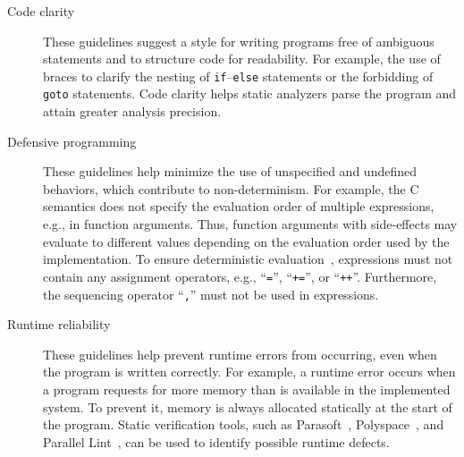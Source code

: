 \begin{description}
	\item[Code clarity] These guidelines suggest a style for writing programs
		  free of ambiguous statements and to structure code for readability. 
		  For example, the use of braces to clarify the nesting of \verb$if$--\verb$else$ statements
		  or the forbidding of \texttt{goto} statements.
		  Code clarity helps static analyzers parse the program and 
		  attain greater analysis precision.
		
	\item[Defensive programming] These guidelines help minimize the use of 
		  unspecified and undefined behaviors, which contribute to
		  non-determinism. For example, the C semantics does not specify 
		  the evaluation order of multiple expressions, e.g.,
		  in function arguments. Thus, function 
		  arguments with side-effects may evaluate to different values 
		  depending on the evaluation order used by the implementation.
		  To ensure deterministic evaluation~\cite{programming_languages_cholera}, 
		  expressions must not contain any assignment operators, e.g., ``\texttt{=}'', 
		  ``\texttt{+=}'', or ``\texttt{++}''. Furthermore, 
		  the sequencing operator ``\texttt{,}'' must not be 
		  used in expressions.
		
	\item[Runtime reliability] These guidelines help prevent runtime errors 
		  from occurring, even when the program is written correctly. 
		  For example, a runtime error occurs when a program requests for 
		  more memory than is available in the implemented system. To prevent
		  it, memory is always allocated statically at the start of the program.
		  Static verification tools, such as Parasoft~\cite{parasoft}, 
		  Polyspace~\cite{polyspace}, and Parallel Lint~\cite{parallel_lint}, 
		  can be used to identify possible runtime defects.
\end{description}


